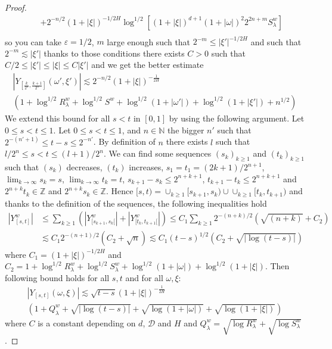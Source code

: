 \documentclass[11pt,a4paper,draft,reqno]{amsart}
\theoremstyle{definition}
\newcommand{\ZZ}{\mathbb{Z}}
\newcommand{\eps}{\varepsilon}
\newcommand{\NN}{\mathbb{N}}
\newcommand{\cD}{\mathcal{D}}
\begin{document}
\begin{proof}
\begin{eqnarray*}
&& 
+ 
2^{-n/2} (1+|\xi|)^{-1/2H} \log^{1/2}\left[(1+|\xi|)^{d+1} (1+|\omega|)^2 2^{2n+m} S^w_\lambda\right]\\
\end{eqnarray*}
so you can take $\eps=1/2$, $m$ large enough such that 
$2^{-m}\le|\xi'|^{-1/2H}$ 
and such that
$2^{-m}\lesssim|\xi'|$ 
thanks to those conditions there exists $C>0$ such that
$C/2\le|\xi'|\le|\xi|\le C|\xi'|$
and we get the better estimate
\begin{multline*}
|Y_{[\frac k {2^{n}},\frac {k+1} {2^{n}}]}(\omega',\xi')|
\lesssim 
2^{-n/2}(1+|\xi|)^{-\frac1{2H}} \\\left(  1+\log^{1/2}R^w_\lambda + \log^{1/2} S^w + \log^{1/2}(1+|\omega'|) + \log^{1/2}(1+ |\xi'|) + n^{1/2}\right)
\end{multline*}
We extend this bound for all $s<t$ in $[0,1]$ by using the following argument. Let $0\le s < t \le 1$. Let $0 \le s < t \le 1$, and $n\in\NN$ the bigger $n'$ such that $2^{-(n'+1)} \le t-s \le 2^{-n'}$. By definition of $n$ there
exists $l$ such that $ l/ {2^n}\le s < t \le  {(l+1)}/ {2^n}$. We can find some sequences $(s_k)_{k\ge1}$ and
$(t_k)_{k\ge1}$ such that $(s_k)$ decreases, $(t_k)$ increases, $s_1=t_1= {(2k+1)}/{2^{n+1}}$, $\lim_{k\to\infty}s_k = s$,
$\lim_{k\to\infty}t_k = t$, $s_{k+1}-s_k\le 2^{n+k+1}$, $t_{k+1}-t_k \le 2^{n+k+1}$ and $2^{n+k}t_k\in \ZZ$ and $2^{n+k}s_k\in
\ZZ$. Hence
$[s,t)=\cup_{k \ge 1} [s_{k+1},s_k) \cup \cup_{k \ge 1} [t_{k},t_{k+1})$
and thanks to the definition of the sequences, the following inequalities hold
\begin{equation}
\label{method Y}
\begin{split}
\left|Y^w_{\left[s,t\right]}\right|
&\le
\sum_{k \ge 1}\left(\left|Y^w_{[s_{k+1},s_k[}\right|+\left|Y^w_{[t_k,t_{k+1}[}\right|\right)\nonumber%
\le
C_1 \sum_{k\ge1}2^{-(n+k)/2}\left(\sqrt{(n+k)}+C_2\right)
\\ &\lesssim
C_1 2^{-(n+1)/2}\left(C_2+\sqrt{n}\right)
\lesssim
C_1 (t-s)^{1/2} \left(C_2+\sqrt{\left|\log(t-s)\right|}\right)
\end{split}
\end{equation}
where $C_1=(1+ |\xi|)^{-1/2H}$ and $C_2 =  1+\log^{1/2}R^w_\lambda +\log^{1/2} S^w_\lambda+\log^{1/2}(1+ |\omega|) + \log^{1/2}(1+ |\xi|)$.
Then following bound holds for all $s,t$ and for all $\omega,\xi$:
\begin{multline*}
\left|Y_{[s,t]}(\omega,\xi)\right| \lesssim \sqrt{t-s}(1+|\xi|)^{-\frac 1 {2H}}\\
\left(1+Q^w_\lambda+\sqrt{|\log (t-s)|} + \sqrt{\log (1+ |\omega|)} + \sqrt{\log (1+ |\xi|)} \right)
\end{multline*}
where $C$ is a constant depending on $d$, $\cD$ and $H$ and 
$Q^w_\lambda = \sqrt{\log R^w_\lambda}+  \sqrt{\log S^w_\lambda}$.
\end{proof}
\end{document}
